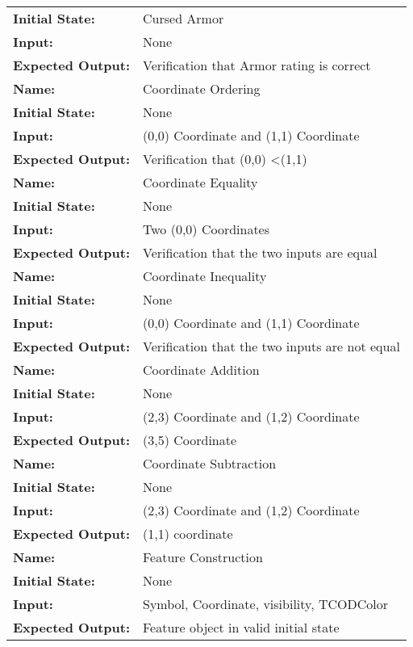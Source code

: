 \documentclass[12pt, titlepage]{article}
\begin{document}
\begin{center}
\begin{longtable}{ l | p{10cm} }
				\textbf{Initial State:} & Cursed Armor\\
				\textbf{Input:} & None\\
				\textbf{Expected Output:} & Verification that Armor rating is correct\\[0.6em]
				\hline
				\rule{0pt}{1.5em}\textbf{Name:} & Coordinate Ordering\\
				\textbf{Initial State:} & None\\
				\textbf{Input:} & (0,0) Coordinate and (1,1) Coordinate\\
				\textbf{Expected Output:} & Verification that (0,0) \textless (1,1)\\[0.6em]
				\hline
				\rule{0pt}{1.5em}\textbf{Name:} & Coordinate Equality\\
				\textbf{Initial State:} & None\\
				\textbf{Input:} & Two (0,0) Coordinates\\
				\textbf{Expected Output:} & Verification that the two inputs are equal\\[0.6em]
				\hline
				\rule{0pt}{1.5em}\textbf{Name:} & Coordinate Inequality\\
				\textbf{Initial State:} & None\\
				\textbf{Input:} & (0,0) Coordinate and (1,1) Coordinate\\
				\textbf{Expected Output:} & Verification that the two inputs are not equal\\[0.6em]
				\hline
				\rule{0pt}{1.5em}\textbf{Name:} & Coordinate Addition\\
				\textbf{Initial State:} & None\\
				\textbf{Input:} & (2,3) Coordinate and (1,2) Coordinate\\
				\textbf{Expected Output:} & (3,5) Coordinate\\[0.6em]
				\hline
				\rule{0pt}{1.5em}\textbf{Name:} & Coordinate Subtraction\\
				\textbf{Initial State:} & None\\
				\textbf{Input:} & (2,3) Coordinate and (1,2) Coordinate\\
				\textbf{Expected Output:} & (1,1) coordinate\\[0.6em]
				\hline
				\rule{0pt}{1.5em}\textbf{Name:} & Feature Construction\\
				\textbf{Initial State:} & None\\
				\textbf{Input:} & Symbol, Coordinate, visibility, TCODColor\\
				\textbf{Expected Output:} & Feature object in valid initial state\\[0.6em]

\end{longtable}
\end{center}
\end{document}

